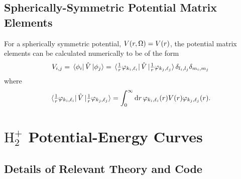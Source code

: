 \documentclass[draft]{article}
\begin{document}
\subsection*{Spherically-Symmetric Potential Matrix Elements}
For a spherically symmetric potential, $V(r, \Omega) = V(r)$, the
potential matrix elements can be calculated numerically to be of the form
\begin{equation}
  \label{eq:me-potential-spherical}
  V_{i, j}
  =
  \bra*{\phi_{i}}
  \hat{V}
  \ket*{\phi_{j}}
  =
  \bra*{\tfrac{1}{r}\varphi_{k_{i}, \ell_{i}}}
  \hat{V}
  \ket*{\tfrac{1}{r}\varphi_{k_{j}, \ell_{j}}}
  \delta_{l_{i}, l_{j}}
  \delta_{m_{i}, m_{j}}
\end{equation}
where
\begin{equation}
  \label{eq:me-potential-spherical-radial}
  \bra*{\tfrac{1}{r}\varphi_{k_{i}, \ell_{i}}}
  \hat{V}
  \ket*{\tfrac{1}{r}\varphi_{k_{j}, \ell_{j}}}
  =
  \int_{0}^{\infty}
  \dd{r}
  \varphi_{k_{i}, \ell_{i}}(r)
  V(r)
  \varphi_{k_{j}, \ell_{j}}(r)
  .
\end{equation}

\clearpage

\section{$\mathrm{H}_{2}^{+}$ Potential-Energy Curves}

\subsection*{Details of Relevant Theory and Code}
\end{document}
